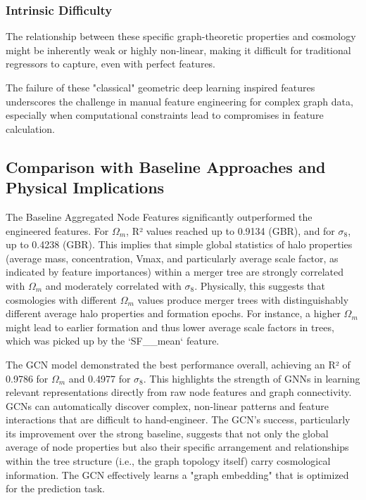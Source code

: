 \documentclass[twocolumn]{aastex631}
\begin{document}
\subsubsection{Intrinsic Difficulty}
The relationship between these specific graph-theoretic properties and cosmology might be inherently weak or highly non-linear, making it difficult for traditional regressors to capture, even with perfect features.

The failure of these "classical" geometric deep learning inspired features underscores the challenge in manual feature engineering for complex graph data, especially when computational constraints lead to compromises in feature calculation.

\subsection{Comparison with Baseline Approaches and Physical Implications}

The Baseline Aggregated Node Features significantly outperformed the engineered features. For $\Omega_m$, R² values reached up to 0.9134 (GBR), and for $\sigma_8$, up to 0.4238 (GBR). This implies that simple global statistics of halo properties (average mass, concentration, Vmax, and particularly average scale factor, as indicated by feature importances) within a merger tree are strongly correlated with $\Omega_m$ and moderately correlated with $\sigma_8$. Physically, this suggests that cosmologies with different $\Omega_m$ values produce merger trees with distinguishably different average halo properties and formation epochs. For instance, a higher $\Omega_m$ might lead to earlier formation and thus lower average scale factors in trees, which was picked up by the `SF\_\_mean` feature.

The GCN model demonstrated the best performance overall, achieving an R² of 0.9786 for $\Omega_m$ and 0.4977 for $\sigma_8$. This highlights the strength of GNNs in learning relevant representations directly from raw node features and graph connectivity. GCNs can automatically discover complex, non-linear patterns and feature interactions that are difficult to hand-engineer. The GCN's success, particularly its improvement over the strong baseline, suggests that not only the global average of node properties but also their specific arrangement and relationships within the tree structure (i.e., the graph topology itself) carry cosmological information. The GCN effectively learns a "graph embedding" that is optimized for the prediction task.
\end{document}
